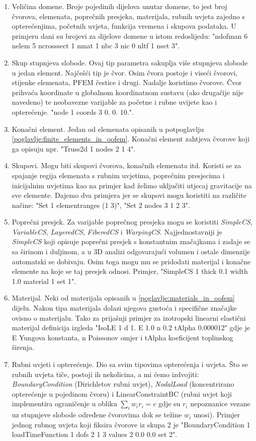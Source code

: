 \documentclass[a4paper,twoside,12pt]{memoir} %
\begin{document}
\begin{enumerate}
\begin{enumerate}
        \item Veličina domene. Broje pojedinih dijelova unutar domene, to jest broj čvorova, elemenata, poprečnih presjeka, materijala, rubnih uvjeta zajedno s opterećenjima, početnih uvjeta, funkcija vremena i skupova podataka. U primjeru dani su brojevi za dijelove domene u istom redoslijedu: "ndofman 6 nelem 5 ncrosssect 1 nmat 1 nbc 3 nic 0 nltf 1 nset 3".
        \item Skup stupnjeva slobode. Ovaj tip parametra sakuplja više stupnjeva slobode u jedan element. Najčešći tip je čvor. Osim čvora postoje i viseći čvorovi, stijenke elemenata, PFEM čestice i drugi. Nadalje koristimo čvorove. Čvor prihvaća koordinate u globalnom koordinatnom sustavu (ako drugačije nije navedeno) te neobavezne varijable za početne i rubne uvijete kao i opterećenje. "node 1 coords 3 0.  0. 10.".
        \item Konačni element. Jedan od elemenata opisanih u potpoglavlju \ref{poglavlje:finite_elements_in_oofem}. Konačni element zahtjeva čvorove koji ga opisuju npr. "Truss2d 1 nodes 2 1 4".
        \item Skupovi. Mogu biti skupovi čvorova, konačnih elemenata itd. Koristi se za spajanje regija elemenata s rubnim uvjetima, poprečnim presjecima i inicijalnim uvjetima kao na primjer kad želimo uključiti utjecaj gravitacije na sve elemente. Dajemo dva primjera jer se skupovi mogu koristiti na različite načine: "Set 1 elementranges {(1 3)}", "Set 2 nodes 3 1 2 3".  
        \item Poprečni presjek. Za varijable poprečnog presjeka mogu se koristiti \textit{SimpleCS}, \textit{VariableCS}, \textit{LayeredCS}, \textit{FiberedCS} i \textit{WarpingCS}. Najjednostavniji je \textit{SimpleCS} koji opisuje poprečni presjek s konstantnim značajkama i zadaje se sa širinom i duljinom, a u 3D analizi odgovarajući volumen i ostale dimenzije automatski se dobivaju. Osim toga mogu mu se pridodati materijal i konačne elemente na koje se taj presjek odnosi. Primjer, "SimpleCS 1 thick 0.1 width 1.0 material 1 set 1".
        \item Materijal. Neki od materijala opisanih u \ref{poglavlje:materials_in_oofem} dijelu. Nakon tipa materijala dolazi njegova gustoća i specifične značajke ovisno o materijalu. Tako za prijašnji primjer za izotropski linearni elastični materijal  definicija izgleda "IsoLE 1 d 1. E 1.0 n 0.2  tAlpha 0.000012" gdje je E Yungova konstanta, n Poissonov omjer i tAlpha koeficijent toplinskog širenja.
        \item Rubni uvjeti i opterećenje. Dio sa svim tipovima opterećenja i uvjeta. Što se rubnih uvjeta tiče, postoji ih nekolicina, a mi ćemo izdvojiti: \textit{BoundaryCondition} (Dirichletov rubni uvjet), \textit{NodalLoad} (koncentrirano opterećenje u pojedinom čvoru) i LinearConstraintBC (rubni uvjet koji implementira ograničenje u obliku $\sum_i w_i r_i = c$ gdje su $r_i$ nepoznanice vezane uz stupnjeve slobode određene čvorovima dok se težine $w_i$ unosi). Primjer jednog rubnog uvjeta koji fiksira čvorove iz skupa 2 je "BoundaryCondition 1 loadTimeFunction 1 dofs 2 1 3 values 2 0.0 0.0 set 2". 

\end{enumerate}
\end{enumerate}
\end{document}

